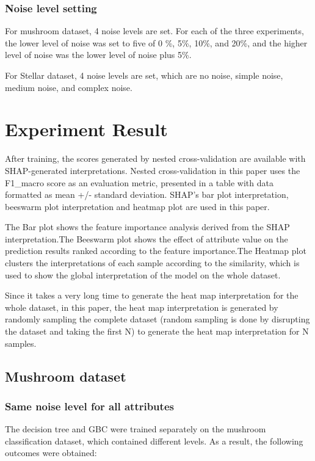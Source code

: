 \documentclass[runningheads,a4paper]{llncs}
\begin{document}
\subsubsection{Noise level setting}
For mushroom dataset, 4 noise levels are set.
For each of the three experiments, the lower level of noise was set to five of 0 \%, 5\%, 10\%, and 20\%, and the higher level of noise was the lower level of noise plus 5\%.

For Stellar dataset, 4 noise levels are set, which are no noise, simple noise, medium noise, and complex noise.

\section{Experiment Result}
After training, the scores generated by nested cross-validation are available with SHAP-generated interpretations. Nested cross-validation in this paper uses the F1\_macro score as an evaluation metric, presented in a table with data formatted as mean +/- standard deviation. SHAP's bar plot interpretation, beeswarm plot interpretation and heatmap plot are used in this paper.

The Bar plot shows the feature importance analysis derived from the SHAP interpretation.The Beeswarm plot shows the effect of attribute value on the prediction results ranked according to the feature importance.The Heatmap plot clusters the interpretations of each sample according to the similarity, which is used to show the global interpretation of the model on the whole dataset.

Since it takes a very long time to generate the heat map interpretation for the whole dataset, in this paper, the heat map interpretation is generated by randomly sampling the complete dataset (random sampling is done by disrupting the dataset and taking the first N) to generate the heat map interpretation for N samples.
\subsection{Mushroom dataset}

\subsubsection{Same noise level for all attributes}

The decision tree and GBC were trained separately on the mushroom classification dataset, which contained different levels. As a result, the following outcomes were obtained:
\end{document}
